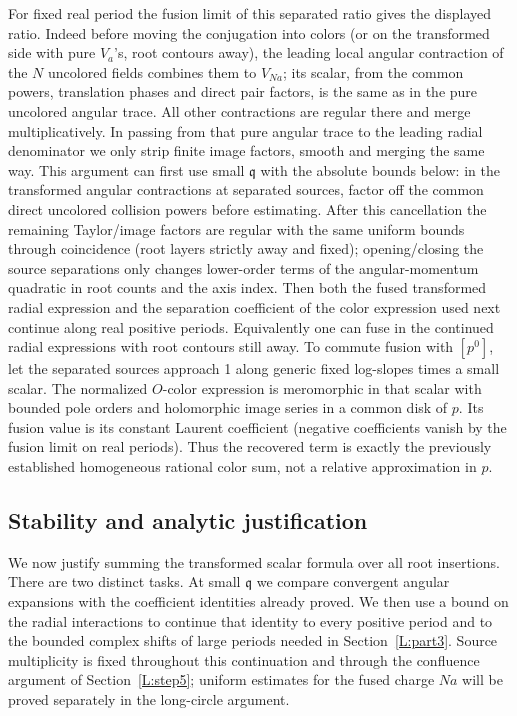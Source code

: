 \documentclass[11pt]{article}
\numberwithin{equation}{section}
\theoremstyle{definition}\newtheorem{definition}[theorem]{Definition}
\theoremstyle{remark}\newtheorem{remark}[theorem]{Remark}
\begin{document}
For fixed real period the fusion limit of this separated ratio gives the displayed ratio. Indeed before moving the conjugation into colors (or on the transformed side with pure \(V_a\)'s, root contours away), the leading local angular contraction of the \(N\) uncolored fields combines them to \(V_{Na}\); its scalar, from the common powers, translation phases and direct pair factors, is the same as in the pure uncolored angular trace. All other contractions are regular there and merge multiplicatively. In passing from that pure angular trace to the leading radial denominator we only strip finite image factors, smooth and merging the same way. This argument can first use small \(\mathfrak q\) with the absolute bounds below: in the transformed angular contractions at separated sources, factor off the common direct uncolored collision powers before estimating. After this cancellation the remaining Taylor/image factors are regular with the same uniform bounds through coincidence (root layers strictly away and fixed); opening/closing the source separations only changes lower-order terms of the angular-momentum quadratic in root counts and the axis index. Then both the fused transformed radial expression and the separation coefficient of the color expression used next continue along real positive periods. Equivalently one can fuse in the continued radial expressions with root contours still away. To commute fusion with \([p^0]\), let the separated sources approach 1 along generic fixed log-slopes times a small scalar. The normalized \(O\)-color expression is meromorphic in that scalar with bounded pole orders and holomorphic image series in a common disk of \(p\). Its fusion value is its constant Laurent coefficient (negative coefficients vanish by the fusion limit on real periods). Thus the recovered term is exactly the previously established homogeneous rational color sum, not a relative approximation in \(p\).

\subsection{Stability and analytic justification}\label{L:step6}

We now justify summing the transformed scalar formula over all root
insertions. There are two distinct tasks. At small $\mathfrak q$ we compare
convergent angular expansions with the coefficient identities already
proved. We then use a bound on the radial interactions to continue that
identity to every positive period and to the bounded complex shifts of
large periods needed in Section~\ref{L:part3}. Source multiplicity is fixed
throughout this continuation and through the confluence argument of
Section~\ref{L:step5}; uniform estimates for the fused charge $Na$ will be
proved separately in the long-circle argument.
\end{document}

